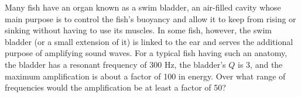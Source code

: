 Many fish have an organ known as a swim bladder, an
air-filled cavity whose main purpose is to control the
fish's buoyancy and allow it to keep from rising or sinking
without having to use its muscles. In some fish, however,
the swim bladder (or a small extension of it) is linked to
the ear and serves the additional purpose of amplifying
sound waves. For a typical fish having such an anatomy, the
bladder has a resonant frequency of 300 Hz, the bladder's
$Q$ is 3, and the maximum amplification is about a factor of
100 in energy. Over what range of frequencies would the
amplification be at least a factor of 50?\answercheck

